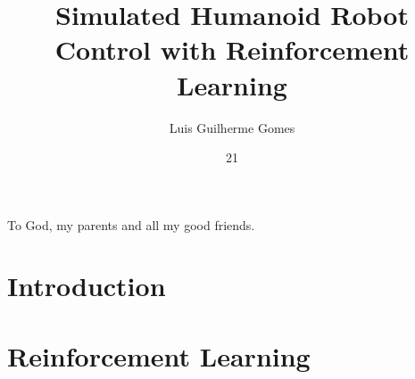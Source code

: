 \documentclass[tg, eng]{ita}    %
\author{Luis Guilherme Gomes}{Aguiar}
\title{Simulated Humanoid Robot Control with Reinforcement Learning}
\date{21}{November}{2018}
\begin{document}
\maketitle

\begin{itadedication}
To God, my parents and all my good friends.
\end{itadedication}

\begin{itathanks}

\end{itathanks}


\begin{abstract}
\noindent

\end{abstract}

\begin{englishabstract}
\noindent

\end{englishabstract}

\listoffigures %


\listofabbreviations

\listofsymbols

\tableofcontents

\mainmatter

\chapter{Introduction}
\label{chap:introduction}


\chapter{Reinforcement Learning}
\label{chap:rl}

\end{document}
